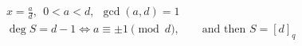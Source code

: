 \documentclass{article}
\begin{document}
\[
\begin{aligned}
&x=\tfrac{a}{d},\ \ 0<a<d,\ \ \gcd(a,d)=1\\
&\deg S=d-1\iff a\equiv\pm1\pmod d,\qquad\text{and then }S=[d]_q
\end{aligned}
\]
\end{document}
